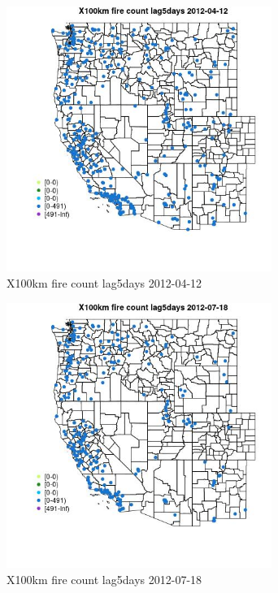 \begin{figure} 
\centering  
\includegraphics[width=0.77\textwidth]{Code_Outputs/Report_ML_input_PM25_Step4_part_e_de_duplicated_aves_compiled_2019-05-14wNAs_MapObsX100km_fire_count_lag5days2012-04-12.jpg} 
\caption{\label{fig:Report_ML_input_PM25_Step4_part_e_de_duplicated_aves_compiled_2019-05-14wNAsMapObsX100km_fire_count_lag5days2012-04-12}X100km fire count lag5days 2012-04-12} 
\end{figure} 
 

\clearpage 

\begin{figure} 
\centering  
\includegraphics[width=0.77\textwidth]{Code_Outputs/Report_ML_input_PM25_Step4_part_e_de_duplicated_aves_compiled_2019-05-14wNAs_MapObsX100km_fire_count_lag5days2012-07-18.jpg} 
\caption{\label{fig:Report_ML_input_PM25_Step4_part_e_de_duplicated_aves_compiled_2019-05-14wNAsMapObsX100km_fire_count_lag5days2012-07-18}X100km fire count lag5days 2012-07-18} 
\end{figure} 
 

